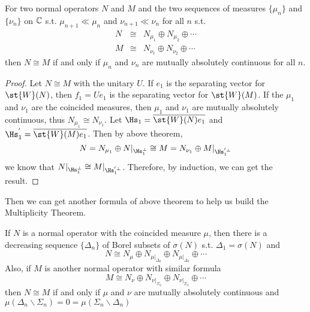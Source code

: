 \begin{thm}
	For two normal operators $N$ and $M$ and the two sequences of measures $\{\mu_n\}$ and $\{\nu_n\}$ on $\mathbb{C}$ s.t. $\mu_{n+1} \ll \mu_{n}$ and $\nu_{n+1} \ll \nu_{n}$ for all $n$ s.t.
	\begin{eqnarray*}
		N &\cong& N_{\mu_1} \oplus N_{\mu_2} \oplus \cdots \\
		M &\cong& N_{\nu_1} \oplus N_{\nu_2} \oplus \cdots
	\end{eqnarray*}
	then $N \cong M$ if and only if $\mu_n$ and $\nu_n$ are mutually absolutely continuous for all $n$.
\end{thm}
\begin{proof}
	Let $N \cong M$ with the unitary $U$. If $e_1$ is the separating vector for $\st{W}(N)$, then $f_1 = Ue_1$ is the separating vector for $\st{W}(M)$. If the $\mu_1$ and $\nu_1$ are the coincided measures, then $\mu_1$ and $\nu_1$ are mutually absolutely continuous, thus $N_{\mu_1} \cong N_{\nu_1}$. Let $\Hs_1 = \clo{\st{W}(N)e_1}$ and $\Hs_1^{'} = \clo{\st{W}(M)e_1}$. Then by above theorem,
	\begin{equation*}
		N = N_{\mu_1} \oplus N|_{\Hs_1^{\bot}} \cong M = N_{\nu_1} \oplus M|_{\Hs_1^{'\bot}}
	\end{equation*}
	we know that $N|_{\Hs_1^{\bot}} \cong M|_{\Hs_1^{'\bot}}$. Therefore, by induction, we can get the result.
\end{proof}

Then we can get another formula of above theorem to help us build the Multiplicity Theorem.
\begin{cor}
 	If $N$ is a normal operator with the coincided measure $\mu$, then there is a decreasing sequence $\{\Delta_n\}$ of Borel subsets of $\sigma(N)$ s.t. $\Delta_1 = \sigma(N)$ and 
 	\begin{equation*}
 		N \cong N_{\mu} \oplus N_{\mu|_{\Delta_2}} \oplus N_{\mu|_{\Delta_3}} \oplus \cdots
 	\end{equation*}
 	Also, if $M$ is another normal operator with similar formula
 	\begin{equation*}
 		M \cong N_{\nu} \oplus N_{\nu|_{\Sigma_2}} \oplus N_{\nu|_{\Sigma_3}} \oplus \cdots
 	\end{equation*}
 	then $N \cong M$ if and only if $\mu$ and $\nu$ are mutually absolutely continuous and $\mu(\Delta_n \backslash \Sigma_n) = 0 = \mu(\Sigma_n \backslash \Delta_n)$
\end{cor}

